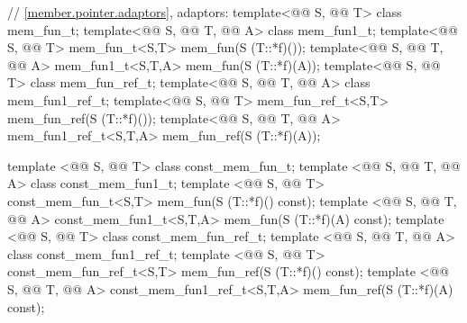 \documentclass[american,twoside]{book}
\begin{document}
\begin{codeblock}
{  // \ref{member.pointer.adaptors}, adaptors:
  template<@@ S, @@ T> class mem_fun_t;
  template<@@ S, @@ T, @@ A> class mem_fun1_t;
  template<@@ S, @@ T>
      mem_fun_t<S,T> mem_fun(S (T::*f)());
  template<@@ S, @@ T, @@ A>
      mem_fun1_t<S,T,A> mem_fun(S (T::*f)(A));
  template<@@ S, @@ T> class mem_fun_ref_t;
  template<@@ S, @@ T, @@ A> class mem_fun1_ref_t;
  template<@@ S, @@ T>
      mem_fun_ref_t<S,T> mem_fun_ref(S (T::*f)());
  template<@@ S, @@ T, @@ A>
      mem_fun1_ref_t<S,T,A> mem_fun_ref(S (T::*f)(A));

  template <@@ S, @@ T> class const_mem_fun_t;
  template <@@ S, @@ T, @@ A> class const_mem_fun1_t;
  template <@@ S, @@ T>
    const_mem_fun_t<S,T> mem_fun(S (T::*f)() const);
  template <@@ S, @@ T, @@ A>
    const_mem_fun1_t<S,T,A> mem_fun(S (T::*f)(A) const);
  template <@@ S, @@ T> class const_mem_fun_ref_t;
  template <@@ S, @@ T, @@ A> class const_mem_fun1_ref_t;
  template <@@ S, @@ T>
    const_mem_fun_ref_t<S,T> mem_fun_ref(S (T::*f)() const);
  template <@@ S, @@ T, @@ A>
    const_mem_fun1_ref_t<S,T,A> mem_fun_ref(S (T::*f)(A) const);

}
\end{codeblock}
\end{document}
